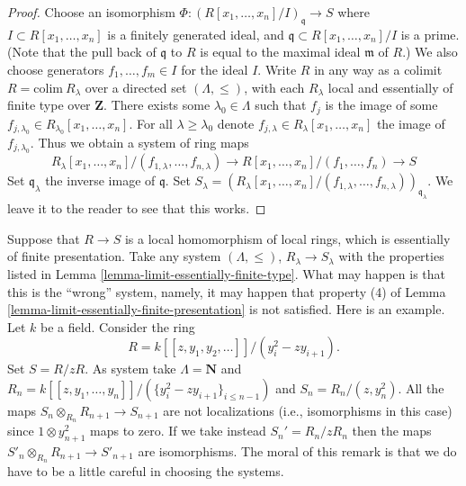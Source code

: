 \begin{proof}
Choose an isomorphism
$\Phi : (R[x_1,\ldots, x_n]/I)_{\mathfrak q} \to S$
where $I \subset R[x_1,\ldots,x_n]$ is a finitely generated ideal,
and $\mathfrak q \subset R[x_1,\ldots, x_n]/I$ is a prime.
(Note that the pull back of $\mathfrak q$ to $R$
is equal to the maximal ideal $\mathfrak m$ of $R$.)
We also choose generators $f_1,\ldots, f_m \in I$ for the ideal $I$.
Write $R$ in any way as a colimit $R = \text{colim}\ R_\lambda$
over a directed set $(\Lambda, \leq )$, with each $R_\lambda$
local and essentially of finite type over $\mathbf{Z}$.
There exists some $\lambda_0 \in \Lambda$ such that $f_j$ is the image
of some $f_{j, \lambda_0} \in R_{\lambda_0}[x_1,\ldots,x_n]$.
For all $\lambda \geq \lambda_0$ denote
$f_{j, \lambda} \in R_{\lambda}[x_1,\ldots,x_n]$ the image
of $f_{j, \lambda_0}$. Thus we obtain a system of ring maps
$$
R_\lambda[x_1,\ldots,x_n]/(f_{1,\lambda}, \ldots, f_{n,\lambda})
\to
R[x_1,\ldots, x_n]/(f_1,\ldots, f_n) \to S
$$
Set $\mathfrak q_\lambda$ the inverse image of $\mathfrak q$.
Set $S_\lambda =
(R_\lambda[x_1,\ldots,x_n]/(f_{1,\lambda}, \ldots, f_{n,\lambda}))_{\mathfrak 
q_\lambda}$. We leave it to the reader to see that this works.
\end{proof}

\begin{remark}
\label{remark-suitable-systems-limits}
Suppose that $R \to S$ is a local homomorphism
of local rings, which is essentially of finite presentation.
Take any system $(\Lambda, \leq)$, $R_\lambda \to S_\lambda$
with the properties listed in
Lemma \ref{lemma-limit-essentially-finite-type}.
What may happen is that this is the ``wrong'' system, namely,
it may happen that property (4) of
Lemma \ref{lemma-limit-essentially-finite-presentation} is not
satisfied. Here is an example. Let $k$ be a field. Consider the ring
$$
R = k[[z, y_1, y_2, \ldots]]/(y_i^2 - zy_{i+1}).
$$
Set $S = R/zR$. As system take $\Lambda = \mathbf{N}$ and
$R_n = k[[z, y_1, \ldots, y_n]]/(\{y_i^2 - zy_{i+1}\}_{i \leq n-1})$
and $S_n = R_n/(z, y_n^2)$. All the maps
$S_n \otimes_{R_n} R_{n + 1} \to S_{n + 1}$
are not localizations (i.e., isomorphisms in this case)
since $1 \otimes y_{n + 1}^2$ maps to zero.
If we take instead $S_n' = R_n/zR_n$ then the
maps $S'_n \otimes_{R_n} R_{n + 1} \to S'_{n + 1}$ are
isomorphisms. The moral of this remark is that we do have to be
a little careful in choosing the systems.
\end{remark}

